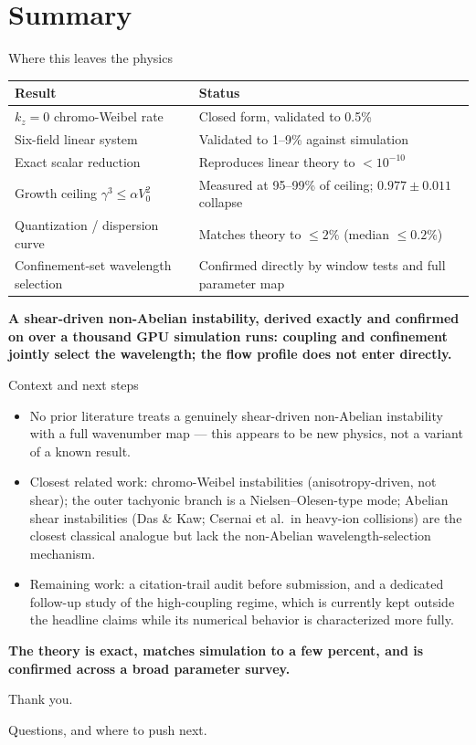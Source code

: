 \documentclass[aspectratio=169,11pt]{beamer}
\newcommand{\Vo}{V_0}
\newcommand{\kz}{k_z}
\begin{document}
\section{Summary}

\begin{frame}{Where this leaves the physics}
\small
\begin{tabular}{p{}p{}}
\toprule
Result & Status\\\midrule
$\kz=0$ chromo-Weibel rate & Closed form, validated to 0.5\%\\
Six-field linear system & Validated to 1--9\% against simulation\\
Exact scalar reduction & Reproduces linear theory to $<10^{-10}$\\
Growth ceiling $\gamma^3\le\alpha\Vo^2$ & Measured at 95--99\% of ceiling; $0.977\pm0.011$ collapse\\
Quantization / dispersion curve & Matches theory to $\le2\%$ (median $\le0.2\%$)\\
Confinement-set wavelength selection & Confirmed directly by window tests and full parameter map\\
\bottomrule
\end{tabular}
\vspace{0.3em}
\centering\textbf{A shear-driven non-Abelian instability, derived exactly and
confirmed on over a thousand GPU simulation runs: coupling and confinement
jointly select the wavelength; the flow profile does not enter directly.}
\end{frame}

\begin{frame}{Context and next steps}
\begin{itemize}
\item No prior literature treats a genuinely shear-driven non-Abelian
instability with a full wavenumber map — this appears to be new physics, not
a variant of a known result.
\item Closest related work: chromo-Weibel instabilities (anisotropy-driven,
not shear); the outer tachyonic branch is a Nielsen--Olesen-type mode;
Abelian shear instabilities (Das \& Kaw; Csernai et al.\ in heavy-ion
collisions) are the closest classical analogue but lack the non-Abelian
wavelength-selection mechanism.
\item Remaining work: a citation-trail audit before submission, and a
dedicated follow-up study of the high-coupling regime, which is currently
kept outside the headline claims while its numerical behavior is
characterized more fully.
\end{itemize}
\vspace{0.2em}
\centering\Large\textbf{The theory is exact, matches simulation to a few
percent, and is confirmed across a broad parameter survey.}
\end{frame}

\begin{frame}
\centering
\Huge Thank you.
\vspace{0.15em}

\normalsize\normalfont Questions, and where to push next.
\end{frame}
\end{document}
